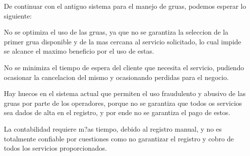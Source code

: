 \begin{description}



\item De continuar con el antiguo sistema para el manejo de gruas, podemos esperar lo siguiente: 
\item No se optimiza el uso de las gruas, ya que no se garantiza la seleccion de la primer grua disponible y de la mas cercana al servicio solicitado, lo cual impide se alcance el maximo beneficio por el uso de estas. 
\item No se minimiza el tiempo de espera del cliente que necesita el servicio, pudiendo ocasionar la cancelacion del mismo y ocasionando perdidas para el negocio. 
\item Hay huecos en el sistema actual que permiten el uso fraudulento y abusivo de las gruas por parte de los operadores, porque no se garantiza que todos os servicios sea dados de alta en el registro, y por ende no se garantiza el pago de estos. \item La contabilidad requiere m?as tiempo, debido al registro manual, y no es totalmente confiable por cuestiones como no garantizar el registro y cobro de todos los servicios proporcionados.


\end{description}


